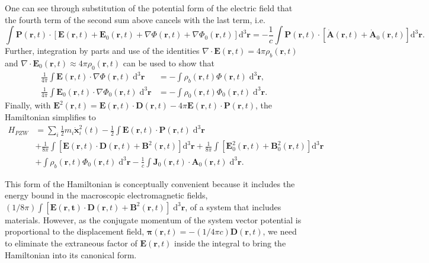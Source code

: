 One can see through substitution of the potential form of the electric field that the fourth term of the second sum above cancels with the last term, i.e.
\begin{equation}
\int\mathbf{P}(\mathbf{r},t)\cdot\left[\mathbf{E}(\mathbf{r},t) + \mathbf{E}_0(\mathbf{r},t) + \nabla\Phi(\mathbf{r},t) + \nabla\Phi_0(\mathbf{r},t)\right]\mathrm{d}^3\mathbf{r} = -\frac{1}{c}\int\mathbf{P}(\mathbf{r},t)\cdot\left[\dot{\mathbf{A}}(\mathbf{r},t) + \dot{\mathbf{A}}_0(\mathbf{r},t)\right]\mathrm{d}^3\mathbf{r}.
\end{equation}
Further, integration by parts and use of the identities $\nabla\cdot\mathbf{E}(\mathbf{r},t) = 4\pi\rho_b(\mathbf{r},t)$ and $\nabla\cdot\mathbf{E}_0(\mathbf{r},t)\approx4\pi\rho_0(\mathbf{r},t)$ can be used to show that
\begin{equation}
\begin{split}
\frac{1}{4\pi}\int\mathbf{E}(\mathbf{r},t)\cdot\nabla\Phi(\mathbf{r},t)\;\mathrm{d}^3\mathbf{r} &= -\int\rho_b(\mathbf{r},t)\Phi(\mathbf{r},t)\;\mathrm{d}^3\mathbf{r},\\
\frac{1}{4\pi}\int\mathbf{E}_0(\mathbf{r},t)\cdot\nabla\Phi_0(\mathbf{r},t)\;\mathrm{d}^3\mathbf{r} &= -\int\rho_0(\mathbf{r},t)\Phi_0(\mathbf{r},t)\;\mathrm{d}^3\mathbf{r}.
\end{split}
\end{equation}
Finally, with $\mathbf{E}^2(\mathbf{r},t) = \mathbf{E}(\mathbf{r},t)\cdot\mathbf{D}(\mathbf{r},t) - 4\pi\mathbf{E}(\mathbf{r},t)\cdot\mathbf{P}(\mathbf{r},t)$, the Hamiltonian simplifies to
\begin{equation}\label{eq:Hpzw}
\begin{split}
H_{PZW} &= \sum_i\frac{1}{2}m_i\dot{\mathbf{x}}_i^2(t) - \frac{1}{2}\int\mathbf{E}(\mathbf{r},t)\cdot\mathbf{P}(\mathbf{r},t)\;\mathrm{d}^3\mathbf{r}\\
& + \frac{1}{8\pi}\int\left[\mathbf{E}(\mathbf{r},t)\cdot\mathbf{D}(\mathbf{r},t) + \mathbf{B}^2(\mathbf{r},t)\right]\mathrm{d}^3\mathbf{r} + \frac{1}{8\pi}\int\left[\mathbf{E}_0^2(\mathbf{r},t) + \mathbf{B}_0^2(\mathbf{r},t)\right]\mathrm{d}^3\mathbf{r}\\
& + \int\rho_b(\mathbf{r},t)\Phi_0(\mathbf{r},t)\;\mathrm{d}^3\mathbf{r} - \frac{1}{c}\int\mathbf{J}_0(\mathbf{r},t)\cdot\mathbf{A}_0(\mathbf{r},t)\;\mathrm{d}^3\mathbf{r}.
\end{split}
\end{equation}

This form of the Hamiltonian is conceptually convenient because it includes the energy bound in the macroscopic electromagnetic fields, $(1/8\pi)\int[\mathbf{E}(\mathbf{r,t})\cdot\mathbf{D}(\mathbf{r},t) + \mathbf{B}^2(\mathbf{r},t)]\;\mathrm{d}^3\mathbf{r}$, of a system that includes materials. However, as the conjugate momentum of the system vector potential is proportional to the displacement field, $\bm{\pi}(\mathbf{r},t) = -(1/4\pi c)\mathbf{D}(\mathbf{r},t)$, we need to eliminate the extraneous factor of $\mathbf{E}(\mathbf{r},t)$ inside the integral to bring the Hamiltonian into its canonical form.
